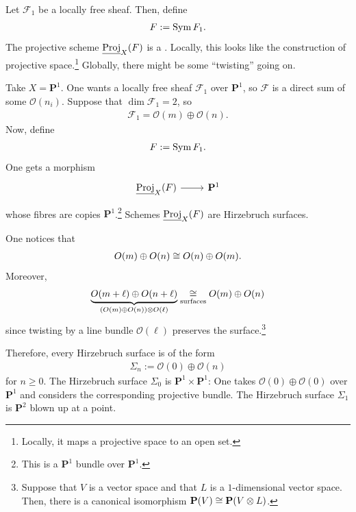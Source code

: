 \documentclass [11 pt, oneside] {article}
\begin{document}
Let $\mathscr{F}_1$ be a locally free sheaf. Then, define
\begin{align*}
	\relax{F}:= \operatorname{Sym} \relax{F}_1.
\end{align*}
The projective scheme $\underline{\operatorname{Proj}}_X(\relax{F})$ is a . Locally, this looks like the construction of projective space.\footnote{Locally, it maps a projective space to an open set.}
Globally, there might be some ``twisting'' going on.

\begin{example}[ ]\label{}\text{}
Take $X=\mathbf{P}^1$. One wants a locally free sheaf $\mathscr{F}_1$ over $\mathbf{P}^1$, so $\mathscr{F}$ is a direct sum of some $\mathscr{O}(n_i)$.
Suppose that $\dim \mathscr{F}_1=2$, so
\begin{align*}
	\mathscr{F}_1 = \mathscr{O}(m)\oplus  \mathscr{O}(n).
\end{align*}
Now, define
\begin{align*}
	\relax{F} := \operatorname{Sym} \relax{F}_1. 
\end{align*}
One gets a morphism
\[
\begin{tikzcd}
	\underline{\Proj}_X(\mathscr{F}) \ar[r]& \mathbf{P}^1
\end{tikzcd}
\]
whose fibres are copies $\mathbf{P}^1$.\footnote{This is a $\mathbf{P}^1$ bundle over $\mathbf{P}^1$.}
Schemes $\underline{\operatorname{Proj}}_X(\relax{F})$ are Hirzebruch surfaces.

One notices that
\begin{align*}
	\relax{O}(m)\oplus  \relax{O}(n) \cong  \relax{O}(n)\oplus  \relax{O}(m).
\end{align*}
Moreover,
\begin{align*}
	\underbrace{\relax{O}(m+\ell) \oplus  \relax{O}(n+\ell)}_{ (\relax{O}(m)\oplus  \relax{O}(n)) \otimes \relax{O}(\ell)} \underset{\textrm{surfaces}}{\cong}  \relax{O}(m)\oplus  \relax{O}(n)
\end{align*}
since twisting by a line bundle $\mathscr{O}(\ell)$ preserves the surface.\footnote{Suppose that $V$ is a vector space and that $L$ is a $1$-dimensional vector space. Then, there is a canonical isomorphism $\mathbf{P}(V)\cong  \mathbf{P}(V\otimes L)$.}

Therefore, every Hirzebruch surface is of the form
\begin{align*}
	\Sigma_n := \mathscr{O}(0)\oplus  \mathscr{O}(n)
\end{align*}
for $n\ge 0$. The Hirzebruch surface $\Sigma_0$ is $\mathbf{P}^1\times \mathbf{P}^1$: One takes $\mathscr{O}(0)\oplus  \mathscr{O}(0)$ over $\mathbf{P}^1$ and considers the corresponding projective bundle.
The Hirzebruch surface $\Sigma_1$ is $\mathbf{P}^2$ blown up at a point. 


\end{example}
\end{document}
